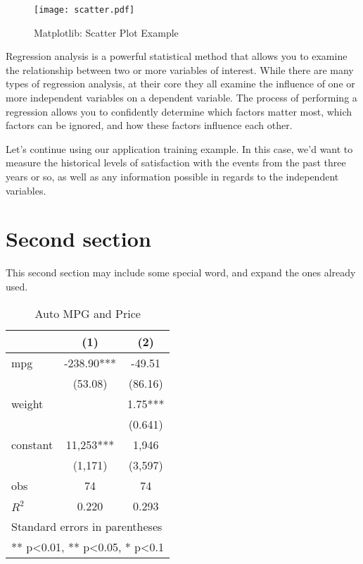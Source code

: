 \documentclass[11pt,fancy,twocol,twoside]{elegantbook}
\begin{document}
\begin{figure}[htbp]
  \centering
  \texttt{[image: scatter.pdf]}
  \caption{Matplotlib: Scatter Plot Example\label{fig:scatter}}
\end{figure}

Regression analysis is a powerful statistical method that allows you to examine the relationship between two or more variables of interest. While there are many types of regression analysis, at their core they all examine the influence of one or more independent variables on a dependent variable. The process of performing a regression allows you to confidently determine which factors matter most, which factors can be ignored, and how these factors influence each other.

Let's continue using our application training example. In this case, we'd want to measure the historical levels of satisfaction with the events from the past three years or so, as well as any information possible in regards to the independent variables. 

\section{Second section}
This second section may include some special word, 
and expand the ones already used.


\begin{table}[htbp]
  \small
  \centering
  \caption{Auto MPG and Price \label{tab:reg}}
    \begin{tabular}{lcc}
    \toprule
                    &       (1)         &        (2)      \\
    \midrule
    mpg             &    -238.90***     &      -49.51     \\
                    &     (53.08)       &      (86.16)    \\
    weight          &                   &      1.75***    \\
                    &                   &      (0.641)    \\
    constant        &     11,253***     &       1,946     \\
                    &     (1,171)       &      (3,597)   \\
    obs             &        74         &         74     \\
    $R^2$           &      0.220        &       0.293    \\
    \bottomrule
    \multicolumn{3}{l}{\scriptsize Standard errors in parentheses} \\
    \multicolumn{3}{l}{\scriptsize *** p<0.01, ** p<0.05, * p<0.1} \\
    \end{tabular}%
\end{table}%
\end{document}
